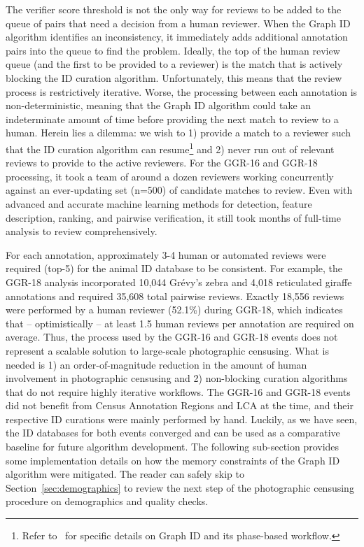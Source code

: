 The verifier score threshold is not the only way for reviews to be added to the queue of pairs that need a decision from a human reviewer.  When the Graph ID algorithm identifies an inconsistency, it immediately adds additional annotation pairs into the queue to find the problem.  Ideally, the top of the human review queue (and the first to be provided to a reviewer) is the match that is actively blocking the ID curation algorithm.  Unfortunately, this means that the review process is restrictively iterative.  Worse, the processing between each annotation is non-deterministic, meaning that the Graph ID algorithm could take an indeterminate amount of time before providing the next match to review to a human.  Herein lies a dilemma: we wish to 1) provide a match to a reviewer such that the ID curation algorithm can resume\footnote{Refer to~\cite{crall_identifying_2017} for specific details on Graph ID and its phase-based workflow.} and 2) never run out of relevant reviews to provide to the active reviewers.  For the GGR-16 and GGR-18 processing, it took a team of around a dozen reviewers working concurrently against an ever-updating set (n=500) of candidate matches to review.  Even with advanced and accurate machine learning methods for detection, feature description, ranking, and pairwise verification, it still took months of full-time analysis to review comprehensively.

For each annotation, approximately 3-4 human or automated reviews were required (top-5) for the animal ID database to be consistent.  For example, the GGR-18 analysis incorporated 10,044 Gr\'evy's zebra and 4,018 reticulated giraffe annotations and required 35,608 total pairwise reviews.  Exactly 18,556 reviews were performed by a human reviewer (52.1\%) during GGR-18, which indicates that -- optimistically -- at least 1.5 human reviews per annotation are required on average.  Thus, the process used by the GGR-16 and GGR-18 events does not represent a scalable solution to large-scale photographic censusing.  What is needed is 1) an order-of-magnitude reduction in the amount of human involvement in photographic censusing and 2) non-blocking curation algorithms that do not require highly iterative workflows.  The GGR-16 and GGR-18 events did not benefit from Census Annotation Regions and LCA at the time, and their respective ID curations were mainly performed by hand.  Luckily, as we have seen, the ID databases for both events converged and can be used as a comparative baseline for future algorithm development.  The following sub-section provides some implementation details on how the memory constraints of the Graph ID algorithm were mitigated.  The reader can safely skip to Section~\ref{sec:demographics} to review the next step of the photographic censusing procedure on demographics and quality checks.

